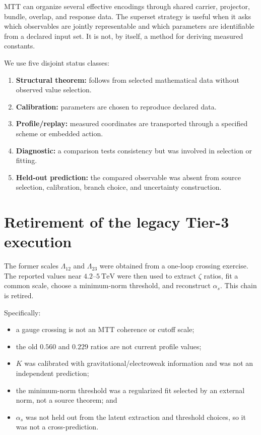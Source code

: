 \documentclass[11pt]{article}
\begin{document}
MTT can organize several effective encodings through shared carrier, projector,
bundle, overlap, and response data. The superset strategy is useful when it
asks which observables are jointly representable and which parameters are
identifiable from a declared input set. It is not, by itself, a method for
deriving measured constants.

We use five disjoint status classes:
\begin{enumerate}
\item \textbf{Structural theorem:} follows from selected mathematical data
without observed value selection.
\item \textbf{Calibration:} parameters are chosen to reproduce declared data.
\item \textbf{Profile/replay:} measured coordinates are transported through a
specified scheme or embedded action.
\item \textbf{Diagnostic:} a comparison tests consistency but was involved in
selection or fitting.
\item \textbf{Held-out prediction:} the compared observable was absent from
source selection, calibration, branch choice, and uncertainty construction.
\end{enumerate}

\section{Retirement of the legacy Tier-3 execution}

The former scales $\Lambda_{12}$ and $\Lambda_{23}$ were obtained from a
one-loop crossing exercise. The reported values near $4.2$--$5~\mathrm{TeV}$
were then used to extract $\zeta$ ratios, fit a common scale, choose a
minimum-norm threshold, and reconstruct $\alpha_s$. This chain is retired.

Specifically:
\begin{itemize}
\item a gauge crossing is not an MTT coherence or cutoff scale;
\item the old $0.560$ and $0.229$ ratios are not current profile values;
\item $K$ was calibrated with gravitational/electroweak information and was
not an independent prediction;
\item the minimum-norm threshold was a regularized fit selected by an external
norm, not a source theorem; and
\item $\alpha_s$ was not held out from the latent extraction and threshold
choices, so it was not a cross-prediction.
\end{itemize}
\end{document}
